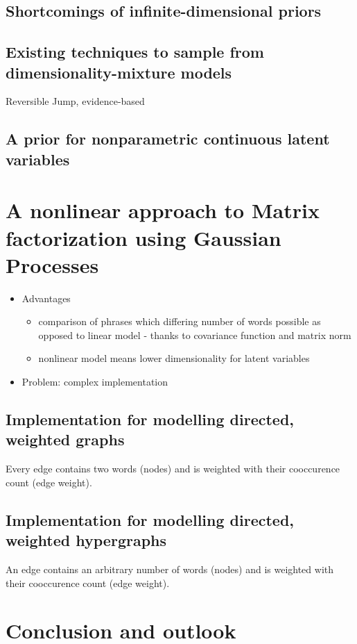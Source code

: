 \section{Shortcomings of infinite-dimensional priors}
\section{Existing techniques to sample from dimensionality-mixture models}
Reversible Jump, evidence-based
\section{A prior for nonparametric continuous latent variables}

\chapter{A nonlinear approach to Matrix factorization using Gaussian Processes}
\begin{itemize}
\item Advantages 
	\begin{itemize}
		\item comparison of phrases which differing number of words possible as opposed to linear model - thanks to covariance function and matrix norm
		\item nonlinear model means lower dimensionality for latent variables
	\end{itemize}
\item Problem: complex implementation
\end{itemize}
\section{Implementation for modelling directed, weighted graphs}
Every edge contains two words (nodes) and is weighted with their cooccurence count (edge weight).
\section{Implementation for modelling directed, weighted hypergraphs}
An edge contains an arbitrary number of words (nodes) and is weighted with their cooccurence count (edge weight).

\chapter{Conclusion and outlook}